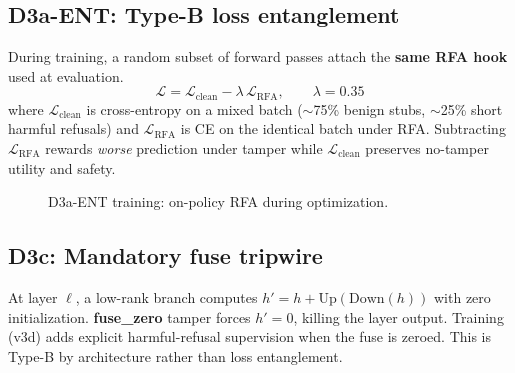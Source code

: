 \documentclass[11pt]{article}
\begin{document}
\subsection{D3a-ENT: Type-B loss entanglement}
\label{sec:d3a}

During training, a random subset of forward passes attach the \textbf{same RFA hook} used at evaluation.
\begin{equation}
  \mathcal{L} = \mathcal{L}_{\text{clean}} - \lambda \, \mathcal{L}_{\text{RFA}}, \qquad \lambda = 0.35
  \label{eq:entangle}
\end{equation}
where $\mathcal{L}_{\text{clean}}$ is cross-entropy on a mixed batch ($\sim$75\% benign stubs, $\sim$25\% short harmful refusals) and $\mathcal{L}_{\text{RFA}}$ is CE on the identical batch under RFA.
Subtracting $\mathcal{L}_{\text{RFA}}$ rewards \emph{worse} prediction under tamper while $\mathcal{L}_{\text{clean}}$ preserves no-tamper utility and safety.

\begin{figure}[t]
  \centering
  \caption{D3a-ENT training: on-policy RFA during optimization.}
  \label{fig:d3a-train}
\end{figure}

\subsection{D3c: Mandatory fuse tripwire}
\label{sec:d3c}

At layer $\ell$, a low-rank branch computes $h' = h + \mathrm{Up}(\mathrm{Down}(h))$ with zero initialization.
\textbf{fuse\_zero} tamper forces $h' = 0$, killing the layer output.
Training (v3d) adds explicit harmful-refusal supervision when the fuse is zeroed.
This is Type-B by architecture rather than loss entanglement.
\end{document}
